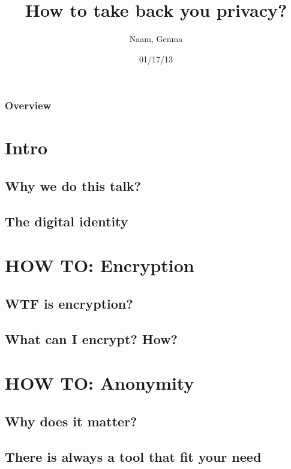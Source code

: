 \documentclass{beamer}
\title[Anonymity and encryption]{How to take back you privacy?}
\author{Naam, Genma}
\institute[@Gconfs]{
EPITA / Gconfs\\
\textit{naam@riseup.net\\ genma@riseup.net}
}
\date{01/17/13}
\begin{document}
\begin{frame}
\titlepage
\end{frame}
\begin{frame}
\frametitle{Overview}
\tableofcontents
\end{frame}


\section{Intro}
\subsection{Why we do this talk?}
\subsection{The digital identity}


\section{HOW TO: Encryption}
\subsection{WTF is encryption?}
\subsection{What can I encrypt? How?}

\section{HOW TO: Anonymity}
\subsection{Why does it matter?}
\subsection{There is always a tool that fit your need}

\end{document}
